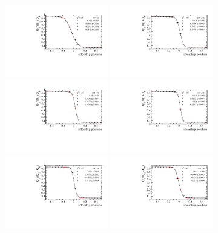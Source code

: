 \begin{figure}[]
\centering
\includegraphics[width=0.4\textwidth]{figs/ChargeSharingvsAngle/cchargeSharing_M3_FanUp_Top_-10.pdf}
\includegraphics[width=0.4\textwidth]{figs/ChargeSharingvsAngle/cchargeSharing_M3_FanUp_Top_-5.pdf}
\includegraphics[width=0.4\textwidth]{figs/ChargeSharingvsAngle/cchargeSharing_M3_FanUp_Top_-2.pdf}
\includegraphics[width=0.4\textwidth]{figs/ChargeSharingvsAngle/cchargeSharing_M3_FanUp_Top_0.pdf}
\includegraphics[width=0.4\textwidth]{figs/ChargeSharingvsAngle/cchargeSharing_M3_FanUp_Top_2.pdf}
\includegraphics[width=0.4\textwidth]{figs/ChargeSharingvsAngle/cchargeSharing_M3_FanUp_Top_5.pdf}

\end{figure}
